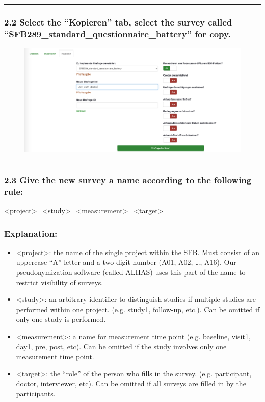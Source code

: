 \par\noindent\rule{\textwidth\color{pniblue}}{0.4pt}
\subsubsection*{2.2 Select the “Kopieren” tab, select the survey called “SFB289\_standard\_questionnaire\_battery” for copy. }
\begin{figure}[H]
\includegraphics[width=1.0\textwidth]{docs/fig/ls_sop2.2.png}
\end{figure}

\par\noindent\rule{\textwidth\color{pniblue}}{0.4pt}
\subsubsection*{2.3 Give the new survey a name according to the following rule:} <project>\_<study>\_<measurement>\_<target>

\subsubsection*{Explanation:}
\begin{itemize}
    \item <project>: the name of the single project within the SFB. Must consist of an uppercase “A” letter and a two-digit number (A01, A02, …, A16). Our pseudonymization software (called ALIIAS) uses this part of the name to restrict visibility of surveys.
    \item <study>: an arbitrary identifier to distinguish studies if multiple studies are performed within one project. (e.g. study1, follow-up, etc.). Can be omitted if only one study is performed. 
    \item <measurement>: a name for measurement time point (e.g. baseline, visit1, day1, pre, post, etc). Can be omitted if the study involves only one measurement time point.
    \item <target>: the “role” of the person who fills in the survey. (e.g. participant, doctor, interviewer, etc). Can be omitted if all surveys are filled in by the participants.
\end{itemize}

